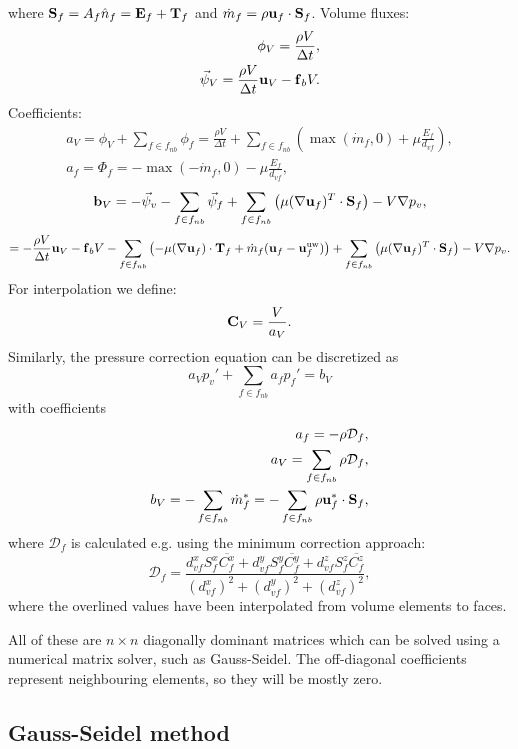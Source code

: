 \documentclass[12pt]{article}
\newcommand{\lb}{\left(}
\newcommand{\rb}{\right)}
\newcommand{\vb}[1]{\text{\textbf{#1}}}
\begin{document}
where $\vb S_f = A_f \hat n_f = \vb E_f + \vb T_f$ and $\dot m_f = \rho \vb u_f \cdot \vb S_f$.
Volume fluxes:
\begin{align}
  \phi_V = \frac{\rho V}{\Delta t}, \\
  \vec \psi_V = \frac{\rho V}{\Delta t} \vb u_V - \vb f_b V.
\end{align}
Coefficients:
\begin{align}
  a_V = \phi_V + \sum_{f \in f_{nb}} \phi_f = \frac{\rho V}{\Delta t} + \sum_{f \in f_{nb}} \lb \max(\dot m_f, 0) + \mu \frac{E_f}{d_{vf}} \rb, \\
  a_f = \Phi_f = -\max(-\dot m_f, 0) - \mu \frac{E_f}{d_{vf}},
\end{align}
\begin{equation}
  \vb b_V = -\vec \psi_v - \sum_{f \in f_{nb}} \vec \psi_f + \sum_{f \in f_{nb}} \lb \mu (\nabla \vb u_f)^T \cdot \vb S_f \rb - V \nabla p_v,
\end{equation}
$$
= - \frac{\rho V}{\Delta t} \vb u_V - \vb f_b V - \sum_{f \in f_{nb}} \lb - \mu (\nabla \vb u_f) \cdot \vb T_f + \dot m_f (\vb u_f - \vb u_f^{\text{uw}}) \rb + \sum_{f \in f_{nb}} \lb \mu (\nabla \vb u_f)^T \cdot \vb S_f \rb - V \nabla p_v.
$$
For interpolation we define:
$$
\vb C_V = \frac{V}{a_V}.
$$
Similarly, the pressure correction equation can be discretized as \cite{mou}
\begin{equation}
  a_V p_v' + \sum_{f \in f_{nb}} a_f p_f' = b_V
\end{equation}
with coefficients
\begin{align}
  a_f = -\rho \mathcal{D}_f, \\
  a_V = \sum_{f \in f_{nb}} \rho \mathcal{D}_f,\\
  b_V = - \sum_{f \in f_{nb}} \dot m_f^* = - \sum_{f \in f_{nb}} \rho \vb u_f^* \cdot \vb S_f,
\end{align}
where $\mathcal{D}_f$ is calculated e.g. using the minimum correction approach:
$$
\mathcal{D}_f = \frac{d_{vf}^x S_f^x \overline{C_f^x} + d_{vf}^y S_f^y \overline{C_f^y} + d_{vf}^z S_f^z \overline{C_f^z}}{(d_{vf}^x)^2 + (d_{vf}^y)^2 + (d_{vf}^z)^2},
$$
where the overlined values have been interpolated from volume elements to faces.

All of these are $n \times n$ diagonally dominant matrices which can be solved using a numerical matrix solver, such as Gauss-Seidel. The off-diagonal coefficients represent neighbouring elements, so they will be mostly zero.

\subsection{Gauss-Seidel method}
\end{document}

